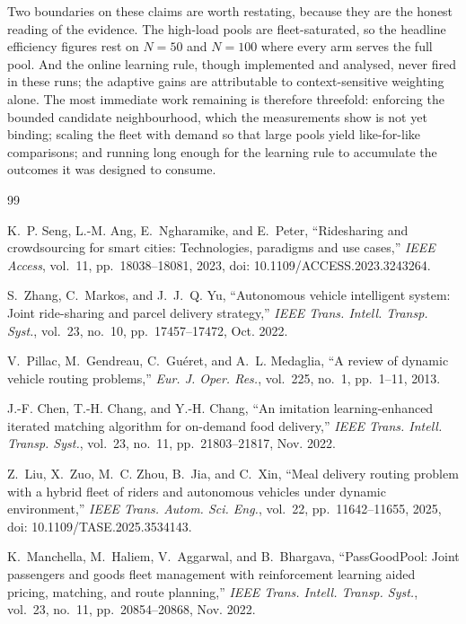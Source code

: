 \documentclass[conference]{IEEEtran}
\begin{document}
Two boundaries on these claims are worth restating, because they are the
honest reading of the evidence. The high-load pools are fleet-saturated, so
the headline efficiency figures rest on $N=50$ and $N=100$ where every arm
serves the full pool. And the online learning rule, though implemented and
analysed, never fired in these runs; the adaptive gains are attributable to
context-sensitive weighting alone. The most immediate work remaining is
therefore threefold: enforcing the bounded candidate neighbourhood, which the
measurements show is not yet binding; scaling the fleet with demand so that
large pools yield like-for-like comparisons; and running long enough for the
learning rule to accumulate the outcomes it was designed to consume.

\balance
\begin{thebibliography}{99}

K.~P. Seng, L.-M. Ang, E.~Ngharamike, and E.~Peter, ``Ridesharing and
crowdsourcing for smart cities: Technologies, paradigms and use cases,''
\emph{IEEE Access}, vol.~11, pp.~18038--18081, 2023,
doi: 10.1109/ACCESS.2023.3243264.

S.~Zhang, C.~Markos, and J.~J.~Q. Yu, ``Autonomous vehicle intelligent
system: Joint ride-sharing and parcel delivery strategy,'' \emph{IEEE Trans.
Intell. Transp. Syst.}, vol.~23, no.~10, pp.~17457--17472, Oct. 2022.

V.~Pillac, M.~Gendreau, C.~Gu\'{e}ret, and A.~L. Medaglia, ``A review of
dynamic vehicle routing problems,'' \emph{Eur. J. Oper. Res.}, vol.~225,
no.~1, pp.~1--11, 2013.

J.-F. Chen, T.-H. Chang, and Y.-H. Chang, ``An imitation learning-enhanced
iterated matching algorithm for on-demand food delivery,'' \emph{IEEE Trans.
Intell. Transp. Syst.}, vol.~23, no.~11, pp.~21803--21817, Nov. 2022.

Z.~Liu, X.~Zuo, M.~C. Zhou, B.~Jia, and C.~Xin, ``Meal delivery routing
problem with a hybrid fleet of riders and autonomous vehicles under dynamic
environment,'' \emph{IEEE Trans. Autom. Sci. Eng.}, vol.~22,
pp.~11642--11655, 2025, doi: 10.1109/TASE.2025.3534143.

K.~Manchella, M.~Haliem, V.~Aggarwal, and B.~Bhargava, ``PassGoodPool: Joint
passengers and goods fleet management with reinforcement learning aided
pricing, matching, and route planning,'' \emph{IEEE Trans. Intell. Transp.
Syst.}, vol.~23, no.~11, pp.~20854--20868, Nov. 2022.


\end{thebibliography}
\end{document}

